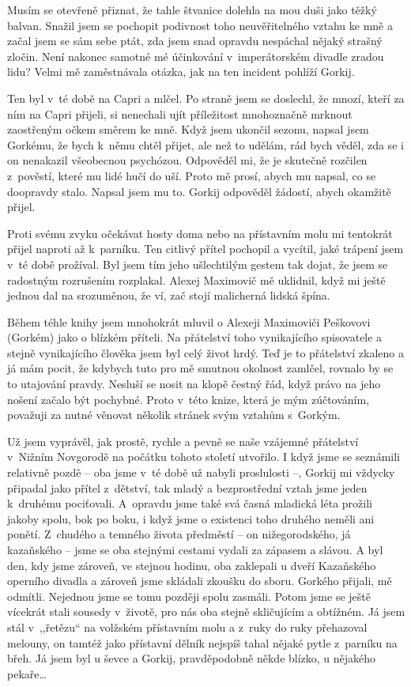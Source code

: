 Musím se otevřeně přiznat, že tahle štvanice dolehla na mou duši jako těžký balvan. Snažil jsem se pochopit podivnost toho neuvěřitelného vztahu ke mně a začal jsem se sám sebe ptát, zda jsem snad opravdu nespáchal nějaký strašný zločin. Není nakonec samotné mé účinkování v imperátorském divadle zradou lidu? Velmi mě zaměstnávala otázka, jak na ten incident pohlíží Gorkij. 

Ten byl v té době na Capri a mlčel. Po straně jsem se doslechl, že mnozí, kteří za ním na Capri přijeli, si nenechali ujít příležitost mnohoznačně mrknout zaostřeným očkem směrem ke mně. Když jsem ukončil sezonu, napsal jsem Gorkému, že bych k němu chtěl přijet, ale než to udělám, rád bych věděl, zda se i on nenakazil všeobecnou psychózou. Odpověděl mi, že je skutečně rozčilen z pověstí, které mu lidé hučí do uší. Proto mě prosí, abych mu napsal, co se doopravdy stalo. Napsal jsem mu to. Gorkij odpověděl žádostí, abych okamžitě přijel. 

Proti svému zvyku očekávat hosty doma nebo na přístavním molu mi tentokrát přijel naproti až k parníku. Ten citlivý přítel pochopil a vycítil, jaké trápení jsem v té době prožíval. Byl jsem tím jeho ušlechtilým gestem tak dojat, že jsem se radostným rozrušením rozplakal. Alexej Maximovič mě uklidnil, když mi ještě jednou dal na srozuměnou, že ví, zač stojí malicherná lidská špína.

\medskip

\noindent
Během téhle knihy jsem mnohokrát mluvil o Alexeji Maximoviči Peškovovi (Gorkém) jako o blízkém příteli. Na přátelství toho vynikajícího spisovatele a stejně vynikajícího člověka jsem byl celý život hrdý. Teď je to přátelství zkaleno a já mám pocit, že kdybych tuto pro mě smutnou okolnost zamlčel, rovnalo by se to utajování pravdy. Nesluší se nosit na klopě čestný řád, když právo na jeho nošení začalo být pochybné. Proto v této knize, která je mým zúčtováním, považuji za nutné věnovat několik stránek svým vztahům s Gorkým. 

Už jsem vyprávěl, jak prostě, rychle a pevně se naše vzájemné přátelství v Nižním Novgorodě na počátku tohoto století utvořilo. I když jsme se seznámili relativně pozdě -- oba jsme v té době už nabyli proslulosti --, Gorkij mi vždycky připadal jako přítel z dětství, tak mladý a bezprostřední vztah jsme jeden k druhému pociťovali. A~opravdu jsme také svá časná mladická léta prožili jakoby spolu, bok po boku, i když jsme o existenci toho druhého neměli ani ponětí. Z chudého a temného života předměstí -- on nižegorodského, já kazaňského -- jsme se oba stejnými cestami vydali za zápasem a slávou. A byl den, kdy jsme zároveň, ve stejnou hodinu, oba zaklepali u dveří Kazaňského operního divadla a zároveň jsme skládali zkoušku do sboru. Gorkého přijali, mě odmítli. Nejednou jsme se tomu později spolu zasmáli. Potom jsme se ještě vícekrát stali sousedy v životě, pro nás oba stejně skličujícím a obtížném. Já jsem stál v~,,řetězu`` na volžském přístavním molu a z ruky do ruky přehazoval melouny, on tamtéž jako přístavní dělník nejspíš tahal nějaké pytle z parníku na břeh. Já jsem byl u ševce a Gorkij, pravděpodobně někde blízko, u nějakého pekaře\ldots

